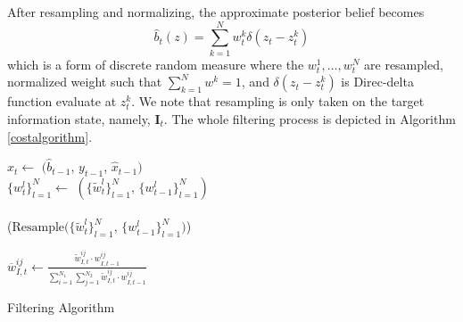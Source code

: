 \documentclass[journal]{IEEEtran}
\begin{document}
After resampling and normalizing, the approximate posterior belief becomes
\[
\hat{b}_t(z) = \sum_{k=1}^{N} 
w_t^{k} \delta(z_t - z_t^{k})
\]
which is a form of discrete random measure where the $w_t^1,\dots,w_t^N$ are resampled, normalized weight such that $\sum_{k=1}^{N} w^{k} = 1$, and $\delta(z_t - z_t^{k})$ is Direc-delta function evaluate at $z_t^{k}$. We note that resampling is only taken on the target information state, namely, $\bm{I}_t$.
The whole filtering process is depicted in Algorithm \ref{costalgorithm}.
{\tiny{
\begin{algorithm}
	\DontPrintSemicolon
	$\hat{x}_{t}\gets$ $(\hat{b}_{t-1}$, $y_{t-1}$, $\hat{x}_{t-1})$ \\
	$\lbrace w_{t}^l \rbrace_{l=1}^N \gets$ $(\lbrace \widetilde{w}_{t}^l \rbrace_{l=1}^N,\,\lbrace w_{t-1}^l \rbrace_{l=1}^N)$ \\			
	 \\
%
	\Begin($\text{Resample} {(} \lbrace \widetilde{w}_{t}^l \rbrace_{l=1}^N,\,\lbrace w_{t-1}^l \rbrace_{l=1}^N {)}$)
	{

		{
			$
			\overline{w}_{I,t}^{ij} \gets \frac{
			\widetilde{w}_{I,t}^{ij} \cdot w_{I,t-1}^{ij}}{\sum_{i = 1}^{N_1}\sum_{j=1}^{N_2} \widetilde{w}_{I,t}^{ij} \cdot w_{I,t-1}^{ij}}$ 
		} 
	
	}
	\caption{Filtering Algorithm}\label{costalgorithm}
\end{algorithm}
}}
\end{document}
